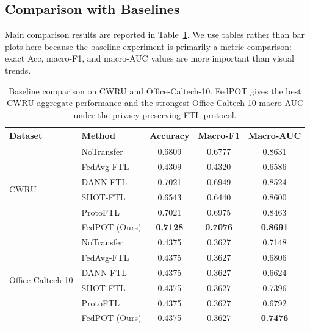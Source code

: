 \documentclass[a4paper,fleqn]{cas-sc}
\begin{document}
\subsection{Comparison with Baselines}
\label{sec:compare}

Main comparison results are reported in Table~\ref{tab:baseline}.
We use tables rather than bar plots here because the baseline experiment is
primarily a metric comparison: exact Acc, macro-F1, and macro-AUC values
are more important than visual trends.

\begin{table}[!htbp]
  \centering
  {\selectfont
  \caption{Baseline comparison on CWRU and Office-Caltech-10. FedPOT gives
    the best CWRU aggregate performance and the strongest Office-Caltech-10
    macro-AUC under the privacy-preserving FTL protocol.}
  \label{tab:baseline}
  \begin{tabular}{llccc}
    \toprule
    Dataset & Method & Accuracy & Macro-F1 & Macro-AUC \\
    \midrule
    \multirow{6}{*}{CWRU}
      & NoTransfer & 0.6809 & 0.6777 & 0.8631 \\
      & FedAvg-FTL & 0.4309 & 0.4320 & 0.6586 \\
      & DANN-FTL & 0.7021 & 0.6949 & 0.8524 \\
      & SHOT-FTL & 0.6543 & 0.6440 & 0.8600 \\
      & ProtoFTL & 0.7021 & 0.6975 & 0.8463 \\
      & FedPOT (Ours) & \textbf{0.7128} & \textbf{0.7076} & \textbf{0.8691} \\
    \midrule
    \multirow{6}{*}{Office-Caltech-10}
      & NoTransfer & 0.4375 & 0.3627 & 0.7148 \\
      & FedAvg-FTL & 0.4375 & 0.3627 & 0.6806 \\
      & DANN-FTL & 0.4375 & 0.3627 & 0.6624 \\
      & SHOT-FTL & 0.4375 & 0.3627 & 0.7396 \\
      & ProtoFTL & 0.4375 & 0.3627 & 0.6792 \\
      & FedPOT (Ours) & 0.4375 & 0.3627 & \textbf{0.7476} \\
    \bottomrule
  \end{tabular}
  }
\end{table}
\FloatBarrier
\end{document}
